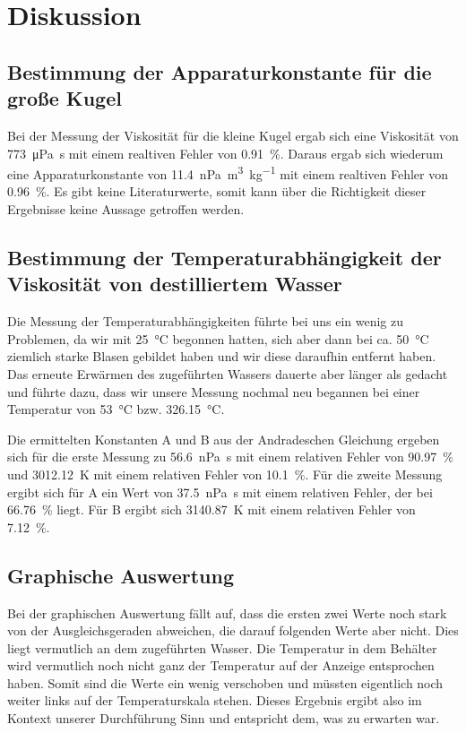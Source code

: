 \section{Diskussion}
\label{sec:Diskussion}

\subsection{Bestimmung der Apparaturkonstante für die große Kugel}
Bei der Messung der Viskosität für die kleine Kugel ergab sich eine Viskosität von \SI{773}{\micro\pascal\second} mit 
einem realtiven Fehler von \SI{0.91}{\percent}.
Daraus ergab sich wiederum eine Apparaturkonstante von \SI{11.4}{\nano\pascal\cubic\meter\per\kilo\gram} mit einem 
realtiven Fehler von \SI{0.96}{\percent}. 
Es gibt keine Literaturwerte, somit kann über die Richtigkeit dieser Ergebnisse keine Aussage getroffen werden. 

\subsection{Bestimmung der Temperaturabhängigkeit der Viskosität von destilliertem Wasser}
Die Messung der Temperaturabhängigkeiten führte bei uns ein wenig zu Problemen, da wir mit \SI{25}{\degreeCelsius} 
begonnen hatten, sich aber dann bei ca. \SI{50}{\degreeCelsius} ziemlich starke Blasen gebildet haben und wir diese 
daraufhin entfernt haben. Das erneute Erwärmen des zugeführten Wassers dauerte aber länger als gedacht und führte 
dazu, dass wir unsere Messung nochmal neu begannen bei einer Temperatur von \SI{53}{\degreeCelsius} bzw. 
\SI{326.15}{\degreeCelsius}.

\noindent Die ermittelten Konstanten A und B aus der Andradeschen Gleichung ergeben sich für die erste Messung zu 
\SI{56.6}{\nano\pascal\second} mit einem relativen Fehler von \SI{90.97}{\percent} und \SI{3012.12}{\kelvin} mit 
einem relativen Fehler von \SI{10.1}{\percent}. Für die zweite Messung ergibt sich für A ein Wert von 
\SI{37.5}{\nano\pascal\second} mit einem relativen Fehler, der bei \SI{66.76}{\percent} liegt. Für B ergibt sich 
\SI{3140.87}{\kelvin} mit einem relativen Fehler von \SI{7.12}{\percent}. 

\subsection{Graphische Auswertung}
Bei der graphischen Auswertung fällt auf, dass die ersten zwei Werte noch stark von der Ausgleichsgeraden abweichen, 
die darauf folgenden Werte aber nicht. Dies liegt vermutlich an dem zugeführten Wasser. Die Temperatur in dem 
Behälter wird vermutlich noch nicht ganz der Temperatur auf der Anzeige entsprochen haben. Somit sind die Werte ein 
wenig verschoben und müssten eigentlich noch weiter links auf der Temperaturskala stehen. Dieses Ergebnis ergibt also 
im Kontext unserer Durchführung Sinn und entspricht dem, was zu erwarten war. 

